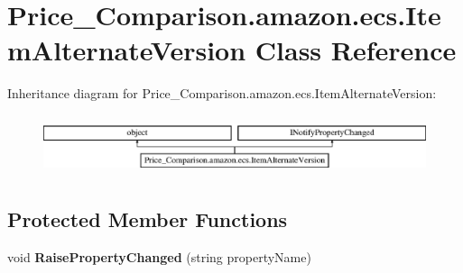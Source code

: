 \hypertarget{class_price___comparison_1_1amazon_1_1ecs_1_1_item_alternate_version}{\section{Price\-\_\-\-Comparison.\-amazon.\-ecs.\-Item\-Alternate\-Version Class Reference}
\label{class_price___comparison_1_1amazon_1_1ecs_1_1_item_alternate_version}
}


 


Inheritance diagram for Price\-\_\-\-Comparison.\-amazon.\-ecs.\-Item\-Alternate\-Version\-:\begin{figure}[H]
\begin{center}
\leavevmode
\includegraphics[height=1.772152cm]{class_price___comparison_1_1amazon_1_1ecs_1_1_item_alternate_version}
\end{center}
\end{figure}
\subsection*{Protected Member Functions}
\begin{DoxyCompactItemize}
\item 
\hypertarget{class_price___comparison_1_1amazon_1_1ecs_1_1_item_alternate_version_a0173cc81af52f06662f934e78a18fb35}{void {\bfseries Raise\-Property\-Changed} (string property\-Name)}\label{class_price___comparison_1_1amazon_1_1ecs_1_1_item_alternate_version_a0173cc81af52f06662f934e78a18fb35}

\end{DoxyCompactItemize}
